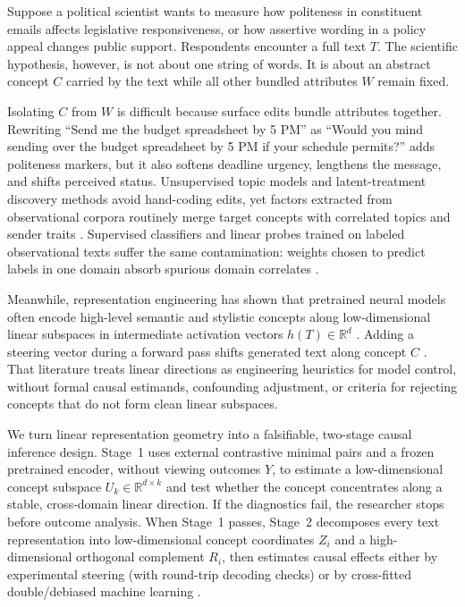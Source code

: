 \documentclass[11pt]{article}
\begin{document}
Suppose a political scientist wants to measure how politeness in constituent emails affects legislative responsiveness, or how assertive wording in a policy appeal changes public support. Respondents encounter a full text $T$. The scientific hypothesis, however, is not about one string of words. It is about an abstract concept $C$ carried by the text while all other bundled attributes $W$ remain fixed.

Isolating $C$ from $W$ is difficult because surface edits bundle attributes together. Rewriting ``Send me the budget spreadsheet by 5 PM'' as ``Would you mind sending over the budget spreadsheet by 5 PM if your schedule permits?'' adds politeness markers, but it also softens deadline urgency, lengthens the message, and shifts perceived status. Unsupervised topic models and latent-treatment discovery methods avoid hand-coding edits, yet factors extracted from observational corpora routinely merge target concepts with correlated topics and sender traits \citep{fong2016discovery,egami2022make,fong2023causal}. Supervised classifiers and linear probes trained on labeled observational texts suffer the same contamination: weights chosen to predict labels in one domain absorb spurious domain correlates \citep{veitch2020adapting,ravfogel2020null,belinkov2022probing}.

Meanwhile, representation engineering has shown that pretrained neural models often encode high-level semantic and stylistic concepts along low-dimensional linear subspaces in intermediate activation vectors $h(T) \in \mathbb{R}^d$ \citep{alain2016understanding,meng2022locating,turner2023activation,zou2023representation,park2023linear}. Adding a steering vector during a forward pass shifts generated text along concept $C$ \citep{li2023inference,rimsky2024steering}. That literature treats linear directions as engineering heuristics for model control, without formal causal estimands, confounding adjustment, or criteria for rejecting concepts that do not form clean linear subspaces.

We turn linear representation geometry into a falsifiable, two-stage causal inference design. Stage~1 uses external contrastive minimal pairs and a frozen pretrained encoder, without viewing outcomes $Y$, to estimate a low-dimensional concept subspace $U_k \in \mathbb{R}^{d \times k}$ and test whether the concept concentrates along a stable, cross-domain linear direction. If the diagnostics fail, the researcher stops before outcome analysis. When Stage~1 passes, Stage~2 decomposes every text representation into low-dimensional concept coordinates $Z_i$ and a high-dimensional orthogonal complement $R_i$, then estimates causal effects either by experimental steering (with round-trip decoding checks) or by cross-fitted double/debiased machine learning \citep[DML;][]{robinson1988root,chernozhukov2018double}.
\end{document}
